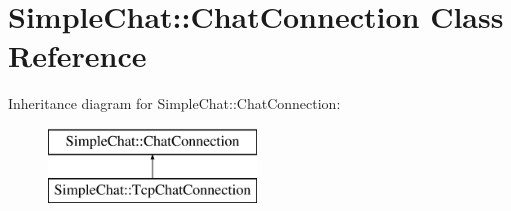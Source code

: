 \hypertarget{classSimpleChat_1_1ChatConnection}{\section{Simple\-Chat\-:\-:Chat\-Connection Class Reference}
\label{classSimpleChat_1_1ChatConnection}
}
Inheritance diagram for Simple\-Chat\-:\-:Chat\-Connection\-:\begin{figure}[H]
\begin{center}
\leavevmode
\includegraphics[height=2.000000cm]{classSimpleChat_1_1ChatConnection}
\end{center}
\end{figure}

